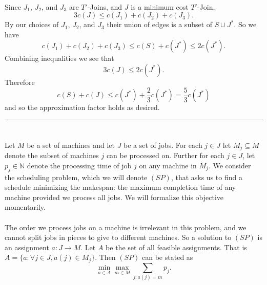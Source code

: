 \documentclass[letterpaper,12pt,oneside,onecolumn]{article}
\newcommand{\N}{\mathbb{N}} \newcommand{\R}{\mathbb{R}}
\newenvironment{proof}{{\bf Proof:  }}{\hfill\rule{2mm}{2mm}}
\begin{document}
\begin{proof}
\paragraph{}
Since $J_1$, $J_2$, and $J_3$ are $T'$-Joins, and $J$ is a minimum cost $T'$-Join,
$$3c(J) \leq c(J_1) + c(J_2) + c(J_3).$$
By our choices of $J_1$, $J_2$, and $J_3$ their union of edges is a subset of $S \cup J^*$. So we have
$$c(J_1) + c(J_2) + c(J_3) \leq c(S) + c(J^*) \leq 2c(J^*).$$
Combining inequalities we see that
$$3c(J) \leq 2c(J^*).$$
Therefore 
$$c(S) + c(J) \leq c(J^*) + \frac{2}{3}c(J^*) = \frac{5}{3}c(J^*)$$
and so the approximation factor holds as desired.
\end{proof}
\section{}
\paragraph{}
Let $M$ be a set of machines and let $J$ be a set of jobs. For each $j \in J$ let $M_j \subseteq M$ denote the subset of machines $j$ can be processed on. Further for each $j \in J$, let $p_j \in \N$ denote the processing time of job $j$ on any machine in $M_j$. We consider the scheduling problem, which we will denote $(SP)$, that asks us to find a schedule minimizing the makespan: the maximum completion time of any machine provided we process all jobs. We will formalize this objective momentarily.
\paragraph{}
The order we process jobs on a machine is irrelevant in this problem, and we cannot split jobs in pieces to give to different machines. So a solution to $(SP)$ is an assignment $a: J \rightarrow M$. Let $A$ be the set of all feasible assignments. That is $A = \{ a : \forall j \in J, a(j) \in M_j\}.$ Then $(SP)$ can be stated as
$$\min_{a \in A} \max_{m \in M} \sum_{j : a(j) = m} p_j.$$
\end{document}

